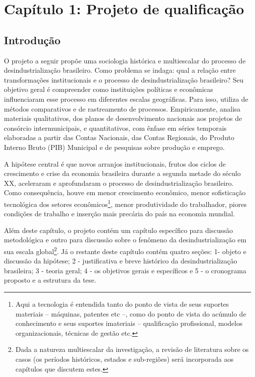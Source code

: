 \section{\texorpdfstring{\textbf{Capítulo 1: Projeto de
qualificação}}{Capítulo 1: Projeto de qualificação}}\label{capuxedtulo-1-projeto-de-qualificauxe7uxe3o}

\subsection{\texorpdfstring{\textbf{Introdução}}{Introdução}}\label{introduuxe7uxe3o}

O projeto a seguir propõe uma sociologia histórica e multiescalar do
processo de desindustrialização brasileiro. Como problema se indaga:
qual a relação entre transformações institucionais e o processo de
desindustrialização brasileiro? Seu objetivo geral é compreender como
instituições políticas e econômicas influenciaram esse processo em
diferentes escalas geográficas. Para isso, utiliza de métodos
comparativos e de rastreamento de processos. Empiricamente, analisa
materiais qualitativos, dos planos de desenvolvimento nacionais aos
projetos de consórcio intermunicipais, e quantitativos, com ênfase em
séries temporais elaboradas a partir das Contas Nacionais, das Contas
Regionais, do Produto Interno Bruto (PIB) Municipal e de pesquisas sobre
produção e emprego.

A hipótese central é que novos arranjos institucionais, frutos dos
ciclos de crescimento e crise da economia brasileira durante a segunda
metade do século XX, aceleraram e aprofundaram o processo de
desindustrialização brasileiro. Como consequência, houve em menor
crescimento econômico, menor sofisticação tecnológica dos setores
econômicos\footnote{Aqui a tecnologia é entendida tanto do ponto de
  vista de seus suportes materiais -- máquinas, patentes etc --, como do
  ponto de vista do acúmulo de conhecimento e seus suportes imateriais
  -- qualificação profissional, modelos organizacionais, técnicas de
  gestão etc.}, menor produtividade do trabalhador, piores condições de
trabalho e inserção mais precária do país na economia mundial.

Além deste capítulo, o projeto contém um capítulo específico para
discussão metodológica e outro para discussão sobre o fenômeno da
desindustrialização em sua escala global\footnote{Dada a natureza
  multiescalar da investigação, a revisão de literatura sobre os casos
  (os períodos históricos, estados e sub-regiões) será incorporada aos
  capítulos que discutem estes.}. Já o restante deste capítulo contém
quatro seções: 1- objeto e discussão da hipótese; 2 - justificativa e
breve histórico da desindustrialização brasileira; 3 - teoria geral; 4 -
os objetivos gerais e específicos e 5 - o cronograma proposto e a
estrutura da tese.

